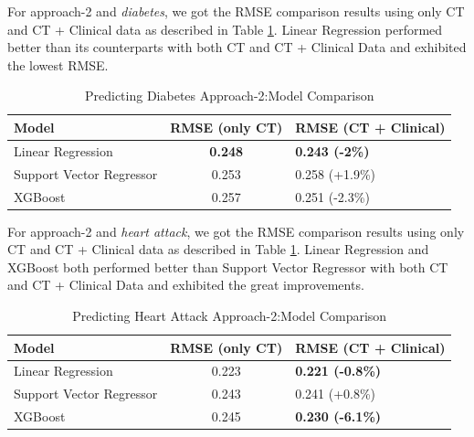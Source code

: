 For approach-2 and \textit{diabetes}, we got the RMSE comparison results using only CT and CT + Clinical data as described in Table \ref{tab:diabetes_approach_2}. Linear Regression performed better than its counterparts with both CT and CT + Clinical Data and exhibited the lowest RMSE. 
\begin{table}[H]
\centering
\begin{tabular}{|l|c|l|}
\hline
\textbf{Model}           & \textbf{RMSE (only CT)} & \textbf{RMSE (CT + Clinical)} \\ \hline
Linear Regression        & \textbf{0.248}                   & \textbf{0.243 (-2\%)}         \\ \hline
Support Vector Regressor & 0.253                   & 0.258 (+1.9\%)                \\ \hline
XGBoost                  & 0.257                   & 0.251 (-2.3\%)                \\ \hline
\end{tabular}
\caption{Predicting Diabetes Approach-2:Model Comparison}
\label{tab:diabetes_approach_2}
\end{table}


For approach-2 and \textit{heart attack}, we got the RMSE comparison results using only CT and CT + Clinical data as described in Table \ref{tab:diabetes_approach_2}. Linear Regression and XGBoost both performed better than Support Vector Regressor with both CT and CT + Clinical Data and exhibited the great improvements. 
\begin{table}[H]
\centering
\begin{tabular}{|l|c|l|}
\hline
\textbf{Model}           & \textbf{RMSE (only CT)} & \textbf{RMSE (CT + Clinical)} \\ \hline
Linear Regression        & 0.223                   & \textbf{0.221 (-0.8\%)}       \\ \hline
Support Vector Regressor & 0.243                   & 0.241 (+0.8\%)                \\ \hline
XGBoost                  & 0.245                   & \textbf{0.230 (-6.1\%)}       \\ \hline
\end{tabular}
\caption{Predicting Heart Attack Approach-2:Model Comparison}
\label{tab:heart_attack_approach_2}
\end{table}